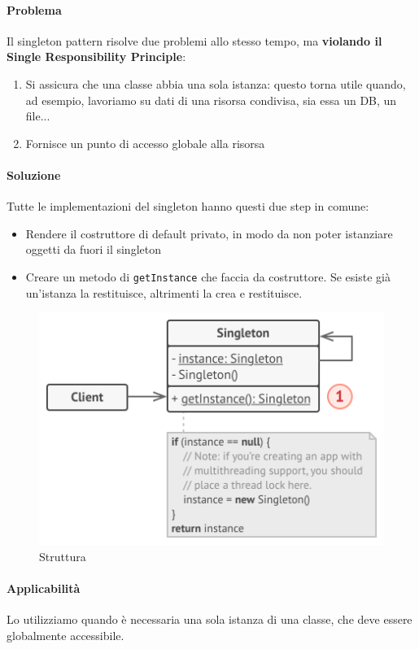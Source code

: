 \documentclass[11pt]{article}
\newcommand{\code}[1]{\texttt{#1}}
\begin{document}
\paragraph{Problema}
Il singleton pattern risolve due problemi allo stesso tempo, ma \textbf{violando il Single Responsibility Principle}:
\begin{enumerate}
    \item Si assicura che una classe abbia una sola istanza: questo torna utile quando, ad esempio, lavoriamo su dati di una risorsa condivisa, sia essa un DB, un file...
    \item Fornisce un punto di accesso globale alla risorsa
\end{enumerate}
\paragraph{Soluzione}
Tutte le implementazioni del singleton hanno questi due step in comune:
\begin{itemize}
    \item Rendere il costruttore di default privato, in modo da non poter istanziare oggetti da fuori il singleton 
    \item Creare un metodo di \code{getInstance} che faccia da costruttore. Se esiste già un'istanza la restituisce, altrimenti la crea e restituisce.
\end{itemize}
\begin{figure}[H]
    \centering
    \includegraphics[width=\linewidth]{res/teoria/Singleton.png}
    \caption{Struttura}
\end{figure}
\paragraph{Applicabilità}
Lo utilizziamo quando è necessaria una sola istanza di una classe, che deve essere globalmente accessibile. 
\end{document}
